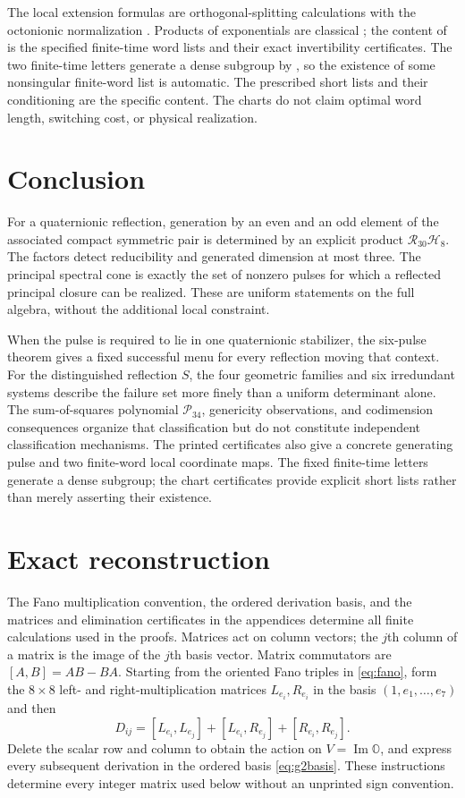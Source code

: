 \documentclass[11pt,a4paper]{article}
\newcommand{\OO}{\mathbb O}
\begin{document}
The local extension formulas are orthogonal-splitting calculations with the octonionic normalization \cite{ChemtovKarigiannis2022}.
Products of exponentials are classical \cite{WeiNorman1964,Altafini2003}; the content of  is the specified finite-time word lists and their exact invertibility certificates.
The two finite-time letters generate a dense subgroup by , so the existence of some nonsingular finite-word list is automatic.  The prescribed short lists and their conditioning are the specific content.
The charts do not claim optimal word length, switching cost, or physical realization.

\section{Conclusion}
For a quaternionic reflection, generation by an even and an odd element of the associated compact symmetric pair is determined by an explicit product $\mathcal R_{30}\mathcal H_8$.
The factors detect reducibility and generated dimension at most three.  The principal spectral cone is exactly the set of nonzero pulses for which a reflected principal closure can be realized.
These are uniform statements on the full algebra, without the additional local constraint.

When the pulse is required to lie in one quaternionic stabilizer, the six-pulse theorem gives a fixed successful menu for every reflection moving that context.
For the distinguished reflection $S$, the four geometric families and six irredundant systems describe the failure set more finely than a uniform determinant alone.
The sum-of-squares polynomial $\mathcal P_{34}$, genericity observations, and codimension consequences organize that classification but do not constitute independent classification mechanisms.
The printed certificates also give a concrete generating pulse and two finite-word local coordinate maps.  The fixed finite-time letters generate a dense subgroup; the chart certificates provide explicit short lists rather than merely asserting their existence.

\section*{Exact reconstruction}
\label{sec:reproducibility}

The Fano multiplication convention, the ordered derivation basis, and the matrices and elimination certificates in the appendices determine all finite calculations used in the proofs.  Matrices act on column vectors; the $j$th column of a matrix is the image of the $j$th basis vector.  Matrix commutators are $[A,B]=AB-BA$.  Starting from the oriented Fano triples in \eqref{eq:fano}, form the $8\times8$ left- and right-multiplication matrices $L_{e_i},R_{e_i}$ in the basis $(1,e_1,\ldots,e_7)$ and then
\[
D_{ij}=[L_{e_i},L_{e_j}]+[L_{e_i},R_{e_j}]+[R_{e_i},R_{e_j}].
\]
Delete the scalar row and column to obtain the action on $V=\operatorname{Im}\OO$, and express every subsequent derivation in the ordered basis \eqref{eq:g2basis}.  These instructions determine every integer matrix used below without an unprinted sign convention.
\end{document}
